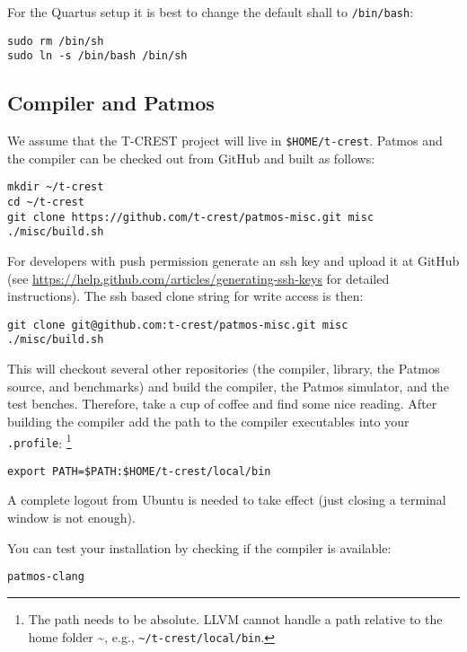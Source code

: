 \documentclass[a4paper,fontsize=10pt,twoside,DIV15,BCOR12mm,headinclude=true,footinclude=false,pagesize,bibtotoc]{scrbook}
\newcommand{\code}[1]{{\texttt{#1}}}
\begin{document}
For the Quartus setup it is best to change the default shall to \code{/bin/bash}:

\begin{verbatim}
sudo rm /bin/sh
sudo ln -s /bin/bash /bin/sh
\end{verbatim}

\subsection{Compiler and Patmos}

We assume that the T-CREST project will live in \code{\$HOME/t-crest}.
Patmos and the compiler can be checked out from GitHub and built as follows:

\begin{verbatim}
mkdir ~/t-crest
cd ~/t-crest
git clone https://github.com/t-crest/patmos-misc.git misc
./misc/build.sh
\end{verbatim}

For developers with push permission generate an ssh key and upload
it at GitHub (see \url{https://help.github.com/articles/generating-ssh-keys}
for detailed instructions).
The ssh based clone string for write access is then:

\begin{verbatim}
git clone git@github.com:t-crest/patmos-misc.git misc
./misc/build.sh
\end{verbatim}

This will checkout several other repositories (the compiler, library,
the Patmos source, and benchmarks) and
build the compiler, the Patmos simulator, and the test benches.
Therefore, take a cup of coffee and find some nice reading.
After building the compiler add the path
to the compiler executables into your \code{.profile}:
\footnote{The path needs to be absolute. LLVM cannot handle
a path relative to the home folder \textasciitilde{}, e.g., \code{\textasciitilde{}/t-crest/local/bin}.}

\begin{verbatim}
export PATH=$PATH:$HOME/t-crest/local/bin
\end{verbatim}

A complete logout from Ubuntu is needed to take effect (just closing
a terminal window is not enough).

You can test your installation by checking if the compiler is available:

\begin{verbatim}
patmos-clang
\end{verbatim}
\end{document}

